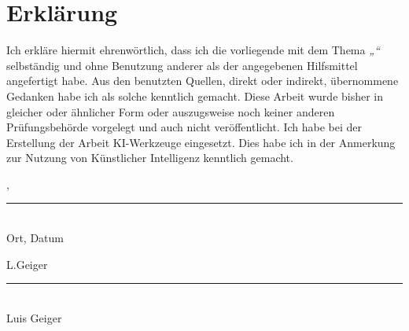 
\chapter*{Erklärung}

Ich erkläre hiermit ehrenwörtlich, dass ich die vorliegende {\documentTypePhrase} mit dem Thema
 \textit{„\documentTitle“} selbständig und
ohne Benutzung anderer als der angegebenen Hilfsmittel angefertigt habe. Aus den
benutzten Quellen, direkt oder indirekt, übernommene Gedanken habe ich als solche
kenntlich gemacht.
Diese Arbeit wurde bisher in gleicher oder ähnlicher Form oder auszugsweise noch
keiner anderen Prüfungsbehörde vorgelegt und auch nicht veröffentlicht.
Ich habe bei der Erstellung der Arbeit KI-Werkzeuge eingesetzt. Dies habe ich in der Anmerkung zur Nutzung von Künstlicher Intelligenz kenntlich gemacht.


\vspace{3em}

\begin{minipage}[t]{0.45\textwidth}
\releaseOrt, \releaseDate
\vspace{-1em}

\rule{6cm}{0.4pt}\\
Ort, Datum
\end{minipage}
\hfill
\begin{minipage}[t]{0.45\textwidth}
L.Geiger
\vspace{-1em}

\rule{6cm}{0.4pt}\\
Luis Geiger
\end{minipage}

